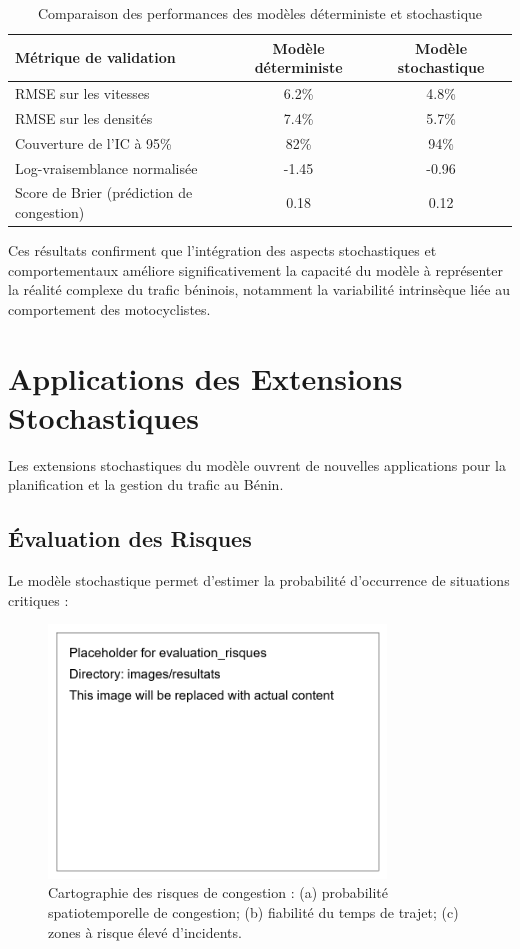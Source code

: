 \begin{table}[htbp]
\centering
\caption{Comparaison des performances des modèles déterministe et stochastique}
\label{tab:comparaison_modeles_stochastiques}
\begin{tabular}{lcc}
\toprule
\textbf{Métrique de validation} & \textbf{Modèle déterministe} & \textbf{Modèle stochastique} \\
\midrule
RMSE sur les vitesses & 6.2\% & 4.8\% \\
RMSE sur les densités & 7.4\% & 5.7\% \\
Couverture de l'IC à 95\% & 82\% & 94\% \\
Log-vraisemblance normalisée & -1.45 & -0.96 \\
Score de Brier (prédiction de congestion) & 0.18 & 0.12 \\
\bottomrule
\end{tabular}
\end{table}

Ces résultats confirment que l'intégration des aspects stochastiques et comportementaux améliore significativement la capacité du modèle à représenter la réalité complexe du trafic béninois, notamment la variabilité intrinsèque liée au comportement des motocyclistes.

\section{Applications des Extensions Stochastiques}
\label{sec:applications}

Les extensions stochastiques du modèle ouvrent de nouvelles applications pour la planification et la gestion du trafic au Bénin.

\subsection{Évaluation des Risques}
\label{subsec:evaluation_risques}

Le modèle stochastique permet d'estimer la probabilité d'occurrence de situations critiques :

\begin{figure}[htbp]
\centering
\includegraphics[width=0.8\textwidth]{images/resultats/evaluation_risques}
\caption{Cartographie des risques de congestion : (a) probabilité spatiotemporelle de congestion; (b) fiabilité du temps de trajet; (c) zones à risque élevé d'incidents.}
\label{fig:evaluation_risques}
\end{figure}

